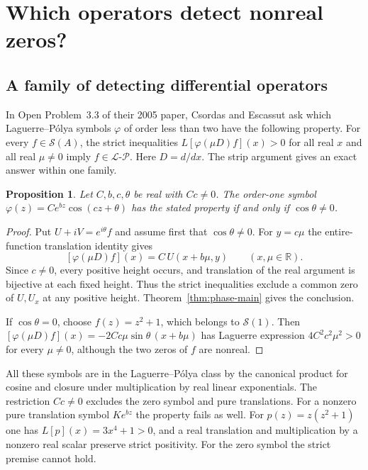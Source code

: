 \documentclass[11pt,a4paper]{article}
\newtheorem{proposition}[theorem]{Proposition}
\numberwithin{equation}{section}
\begin{document}
\section{Which operators detect nonreal zeros?}
\subsection{A family of detecting differential operators}

In Open Problem~3.3 of their 2005 paper, Csordas and Escassut ask which
Laguerre--P\'olya symbols $\varphi$ of order less than two have the
following property. For every $f\in\mathcal S(A)$, the strict inequalities
$L[\varphi(\mu D)f](x)>0$ for all real $x$ and all real $\mu\ne0$
imply $f\in\mathcal L\text{-}\mathcal P$. Here $D=d/dx$.
The strip argument gives an exact answer within one family.

\begin{proposition}
Let $C,b,c,\theta$ be real with $Cc\ne0$. The order-one symbol
$\varphi(z)=C e^{bz}\cos(cz+\theta)$ has the stated property
if and only if $\cos\theta\ne0$.
\end{proposition}

\begin{proof}
Put $U+iV=e^{i\theta}f$ and assume first that $\cos\theta\ne0$.
For $y=c\mu$ the entire-function translation identity gives
\[
 [\varphi(\mu D)f](x)= C\,U(x+b\mu,y)
 \qquad(x,\mu\in\mathbb R).
\]
Since $c\ne0$, every positive height occurs, and translation of the
real argument is bijective at each fixed height. Thus the strict
inequalities exclude a common zero of $U,U_x$ at any positive
height. Theorem~\ref{thm:phase-main} gives the conclusion.

If $\cos\theta=0$, choose $f(z)=z^2+1$, which belongs to $\mathcal S(1)$.
Then $[\varphi(\mu D)f](x)=-2C c\mu\sin\theta\,(x+b\mu)$
has Laguerre expression $4C^2c^2\mu^2>0$ for every $\mu\ne0$,
although the two zeros of $f$ are nonreal.
\end{proof}

All these symbols are in the Laguerre--P\'olya class by the canonical
product for cosine and closure under multiplication by real linear
exponentials. The restriction $Cc\ne0$ excludes the zero symbol and
pure translations. For a nonzero pure translation symbol
$K e^{bz}$ the property fails as well. For $p(z)=z(z^2+1)$ one has $L[p](x)=3x^4+1>0$, and a real
translation and multiplication by a nonzero real scalar preserve
strict positivity. For the zero symbol the strict premise cannot hold.
\end{document}
